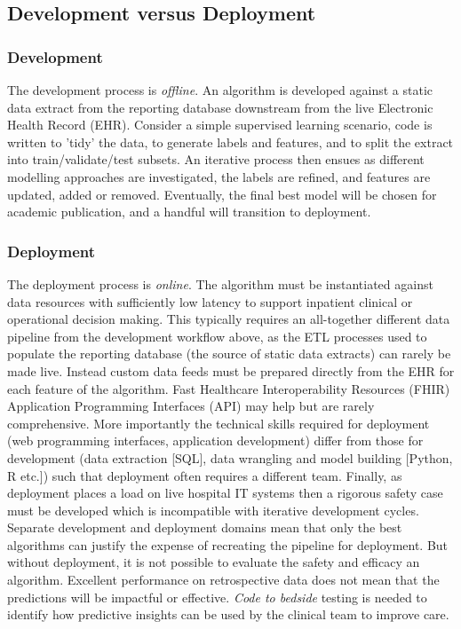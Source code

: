 \documentclass[pmlr,twocolumn,10pt]{jmlr} %
\begin{document}
\subsection{Development versus Deployment}
\subsubsection{Development}
The development process is \textit{offline}. An algorithm is developed against a static data extract from the reporting database downstream from the live Electronic Health Record (EHR). Consider a simple supervised learning scenario, code is written to  'tidy' the data, to generate labels and features, and to split the extract into train/validate/test subsets. An iterative process then ensues as different modelling approaches are investigated, the labels are refined, and features are updated, added or removed. Eventually, the final best model will be chosen for academic publication, and a handful will transition to deployment.
\subsubsection{Deployment}
The deployment process is \textit{online}. The algorithm must be instantiated against data resources with sufficiently low latency to support inpatient clinical or operational decision making. This typically requires an all-together different data pipeline from the development workflow above, as the ETL processes used to populate the reporting database (the source of static data extracts) can rarely be made live. Instead custom data feeds must be prepared directly from the EHR for each feature of the algorithm.\citep{sendak2020} Fast Healthcare Interoperability Resources (FHIR) Application Programming Interfaces (API) may help but are rarely comprehensive.\citep{jones2021} More importantly the technical skills required for deployment (web programming interfaces, application development) differ from those for development (data extraction [SQL], data wrangling and model building [Python, R etc.]) such that deployment often requires a different team. Finally, as deployment places a load on live hospital IT systems then a rigorous safety case must be developed which is incompatible with iterative development cycles.
Separate development and deployment domains mean that only the best algorithms can justify the expense of recreating the pipeline for deployment. But without deployment, it is not possible to evaluate the safety and efficacy an algorithm. Excellent performance on retrospective data does not mean that the predictions will be impactful or effective.\citep{the2021} \textit{Code to bedside} testing is needed to identify how predictive insights can be used by the clinical team to improve care.
\end{document}
